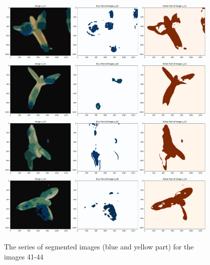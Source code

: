 \documentclass{article}
\begin{document}
\begin{figure}[h!]
\centering
\includegraphics[width=0.95\textwidth]{Report/Images/Appendix Images/ColorSegments/Image41.png}
\includegraphics[width=0.95\textwidth]{Report/Images/Appendix Images/ColorSegments/Image42.png}
\includegraphics[width=0.95\textwidth]{Report/Images/Appendix Images/ColorSegments/Image43.png}
\includegraphics[width=0.95\textwidth]{Report/Images/Appendix Images/ColorSegments/Image44.png}
\caption{The series of segmented images (blue and yellow part) for the images 41-44} 
\label{fig:segment41-44}
\end{figure}
\end{document}
